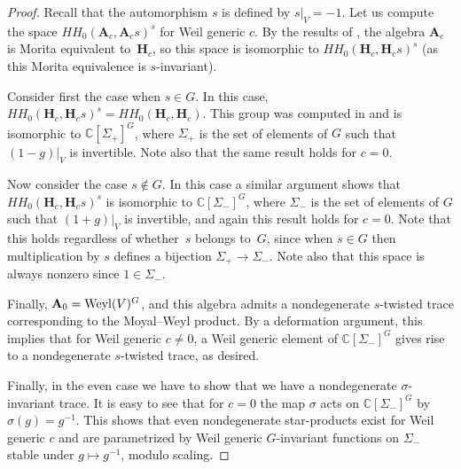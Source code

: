 \documentclass[pdftex]{sigma}
\numberwithin{equation}{section}
\begin{document}
\begin{proof} Recall that the automorphism $s$ is defined by $s|_V=-1$. Let us compute the space $HH_0({\mathbf A}_c,{\mathbf A}_cs)^s$ for Weil generic $c$. By the results of \cite{EG}, the algebra ${\mathbf A}_c$ is Morita equivalent to~${\mathbf{H}}_c$, so this space is isomorphic to $HH_0({\mathbf{H}}_c,{\mathbf{H}}_cs)^s$ (as this Morita equivalence is $s$-invariant).

Consider first the case when $s\in G$. In this case, $HH_0({\mathbf{H}}_c,{\mathbf{H}}_cs)^s=HH_0({\mathbf{H}}_c,{\mathbf{H}}_c)$. This group was computed in \cite{EG} and is isomorphic to ${\mathbb C}[\Sigma_+]^G$, where $\Sigma_+$ is the set of elements of $G$ such that $(1-g)|_V$ is invertible. Note also that the same result holds for $c=0$.

Now consider the case $s\notin G$. In this case a similar argument shows that
$HH_0({\mathbf{H}}_c,{\mathbf{H}}_cs)^s$ is isomorphic to ${\mathbb C}[\Sigma_-]^G$, where $\Sigma_-$ is the set of elements of $G$ such that $(1+g)|_V$ is invertible, and again this result holds for $c=0$. Note that this holds regardless of whether~$s$ belongs to~$G$, since when $s\in G$ then multiplication by $s$ defines a bijection
$\Sigma_+\to \Sigma_-$. Note also that this space is always nonzero since $1\in \Sigma_-$.

Finally, ${\mathbf A}_0={\rm Weyl}(V)^G$, and this algebra admits a nondegenerate $s$-twisted trace corresponding to the Moyal--Weyl product. By a deformation argument, this implies that for Weil generic $c\ne 0$, a Weil generic
element of ${\mathbb C}[\Sigma_-]^G$ gives rise to a nondegenerate $s$-twisted trace, as desired.

Finally, in the even case we have to show that we have a nondegenerate $\sigma$-invariant trace.
It is easy to see that for $c=0$ the map $\sigma$ acts on ${\mathbb C}[\Sigma_-]^G$ by $\sigma(g)=g^{-1}$.
This shows that even nondegenerate star-products exist for Weil generic $c$ and are parametrized by Weil generic $G$-invariant functions on $\Sigma_-$ stable under $g\mapsto g^{-1}$, modulo scaling.
\end{proof}
\end{document}
